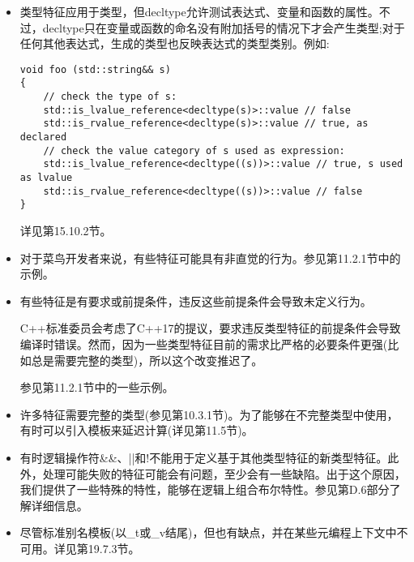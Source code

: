 \begin{itemize}
\item 
类型特征应用于类型，但decltype允许测试表达式、变量和函数的属性。不过，decltype只在变量或函数的命名没有附加括号的情况下才会产生类型;对于任何其他表达式，生成的类型也反映表达式的类型类别。例如:

\begin{lstlisting}[style=styleCXX]
void foo (std::string&& s)
{
	// check the type of s:
	std::is_lvalue_reference<decltype(s)>::value // false
	std::is_rvalue_reference<decltype(s)>::value // true, as declared
	// check the value category of s used as expression:
	std::is_lvalue_reference<decltype((s))>::value // true, s used as lvalue
	std::is_rvalue_reference<decltype((s))>::value // false
}
\end{lstlisting}

详见第15.10.2节。

\item 
对于菜鸟开发者来说，有些特征可能具有非直觉的行为。参见第11.2.1节中的示例。

\item 
有些特征是有要求或前提条件，违反这些前提条件会导致未定义行为。

\begin{tcolorbox}[colback=webgreen!5!white,colframe=webgreen!75!black]
\hspace*{0.75cm}C++标准委员会考虑了C++17的提议，要求违反类型特征的前提条件会导致编译时错误。然而，因为一些类型特征目前的需求比严格的必要条件更强(比如总是需要完整的类型)，所以这个改变推迟了。
\end{tcolorbox}

参见第11.2.1节中的一些示例。

\item 
许多特征需要完整的类型(参见第10.3.1节)。为了能够在不完整类型中使用，有时可以引入模板来延迟计算(详见第11.5节)。

\item 
有时逻辑操作符\&\&、||和!不能用于定义基于其他类型特征的新类型特征。此外，处理可能失败的特征可能会有问题，至少会有一些缺陷。出于这个原因，我们提供了一些特殊的特性，能够在逻辑上组合布尔特性。参见第D.6部分了解详细信息。

\item 
尽管标准别名模板(以\_t或\_v结尾)，但也有缺点，并在某些元编程上下文中不可用。详见第19.7.3节。
\end{itemize}



